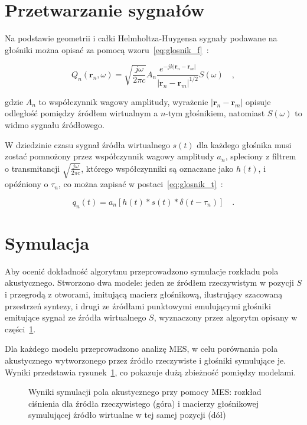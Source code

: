 \documentclass[12pt]{oska}
\let\Oldsection\section
\renewcommand{\section}{\FloatBarrier\Oldsection}
\begin{document}
\section{Przetwarzanie sygnałów}\label{s:algorithm}

Na podstawie geometrii i całki Helmholtza-Huygensa 
sygnały podawane na głośniki można opisać za pomocą
wzoru~\eqref{eq:glosnik_f}~\cite{delay}:

\begin{equation}
  Q_n(\bm{r}_n,\omega) = \sqrt{\frac{j\omega}{2\pi c}} A_n \frac {e^{-jk|\bm{r}_n-\bm{r}_m|}}{|\bm{r}_n-\bm{r}_m|^{1/2}} S(\omega) \quad,
  \label{eq:glosnik_f}
\end{equation}

gdzie $A_n$ to współczynnik wagowy amplitudy, wyrażenie
$|\bm{r}_n-\bm{r}_m|$ opisuje odległość pomiędzy źródłem wirtualnym
a $n$-tym głośnikiem, natomiast $S(\omega)$ to widmo sygnału źródłowego.

W dziedzinie czasu sygnał źródła wirtualnego $s(t)$ dla każdego głośnika musi zostać pomnożony
przez współczynnik wagowy amplitudy $a_n$, spleciony z filtrem o transmitancji 
$\sqrt{\frac{j\omega}{2\pi c}}$, którego współczynniki są oznaczane jako $h(t)$, i
opóźniony o $\tau_n$, co można zapisać w postaci~\eqref{eq:glosnik_t}~\cite{enhancement}:

\begin{equation}
  q_n(t) = a_n\left[h(t)*s(t)*\delta(t-\tau_n)\right] \quad. \label{eq:glosnik_t}
\end{equation}

\section{Symulacja}

Aby ocenić dokładność algorytmu przeprowadzono symulacje rozkładu pola akustycznego.
Stworzono dwa modele: jeden ze
źródłem rzeczywistym w pozycji $S$ i przegrodą z otworami, imitującą macierz
głośnikową, ilustrujący szacowaną przestrzeń syntezy, i drugi ze źródłami
punktowymi emulującymi głośniki emitujące sygnał ze źródła wirtualnego $S$,
wyznaczony przez algorytm opisany w części~\ref{s:algorithm}.

Dla każdego modelu przeprowadzono analizę MES, w celu porównania pola akustycznego
wytworzonego przez źródło rzeczywiste i głośniki
symulujące je. Wyniki przedstawia rysunek~\ref{r:fem}, co pokazuje dużą zbieżność
pomiędzy modelami.

\begin{figure}[!tbh]
  \centering
  \caption{Wyniki symulacji pola akustycznego przy pomocy MES:
    rozkład ciśnienia dla źródła rzeczywistego (góra) i macierzy głośnikowej
  symulującej źródło wirtualne w tej samej pozycji (dół)}
  \label{r:fem}
\end{figure}
\end{document}
